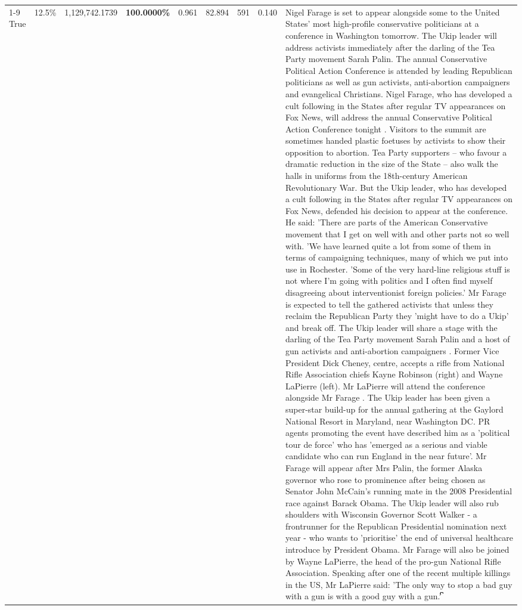\begin{table}[H]
\begin{tabular}{lllrlllll}
\cline{1-9} \cline{2-9}
True & 12.5\% & 1,129,742.1739 & \bfseries \color{red} 100.0000\% & 0.961 & 82.894 & 591 & 0.140 & Nigel Farage is set to appear alongside some to the United States' most high-profile conservative politicians at a conference in Washington tomorrow. The Ukip leader will address activists immediately after the darling of the Tea Party movement Sarah Palin. The annual Conservative Political Action Conference is attended by leading Republican politicians as well as gun activists, anti-abortion campaigners and evangelical Christians. Nigel Farage, who has developed a cult following in the States after regular TV appearances on Fox News, will address the annual Conservative Political Action Conference tonight . Visitors to the summit are sometimes handed plastic foetuses by activists to show their opposition to abortion. Tea Party supporters – who favour a dramatic reduction in the size of the State – also walk the halls in uniforms from the 18th-century American Revolutionary War. But the Ukip leader, who has developed a cult following in the States after regular TV appearances on Fox News, defended his decision to appear at the conference. He said: 'There are parts of the American Conservative movement that I get on well with and other parts not so well with. 'We have learned quite a lot from some of them in terms of campaigning techniques, many of which we put into use in Rochester. 'Some of the very hard-line religious stuff is not where I'm going with politics and I often find myself disagreeing about interventionist foreign policies.' Mr Farage is expected to tell the gathered activists that unless they reclaim the Republican Party they 'might have to do a Ukip' and break off. The Ukip leader will share a stage with the darling of the Tea Party movement Sarah Palin and a host of gun activists and anti-abortion campaigners . Former Vice President Dick Cheney, centre, accepts a rifle from National Rifle Association chiefs Kayne Robinson (right) and Wayne LaPierre (left). Mr LaPierre will attend the conference alongside Mr Farage . The Ukip leader has been given a super-star build-up for the annual gathering at the Gaylord National Resort in Maryland, near Washington DC. PR agents promoting the event have described him as a 'political tour de force' who has 'emerged as a serious and viable candidate who can run England in the near future'. Mr Farage will appear after Mrs Palin, the former Alaska governor who rose to prominence after being chosen as Senator John McCain's running mate in the 2008 Presidential race against Barack Obama. The Ukip leader will also rub shoulders with Wisconsin Governor Scott Walker - a frontrunner for the Republican Presidential nomination next year - who wants to 'prioritise' the end of universal healthcare introduce by President Obama. Mr Farage will also be joined by Wayne LaPierre, the head of the pro-gun National Rifle Association. Speaking after one of the recent multiple killings in the US, Mr LaPierre said: 'The only way to stop a bad guy with a gun is with a good guy with a gun.'͆ \\

\end{tabular}
\end{table}
